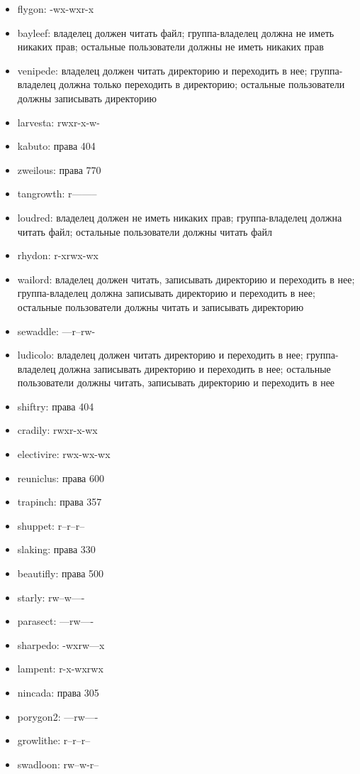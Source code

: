 \documentclass{article}
\begin{document}
\begin{itemize}
  \item flygon: -wx-wxr-x
  \item bayleef: владелец должен читать файл; группа-владелец должна не иметь никаких прав; остальные пользователи должны не иметь никаких прав
  \item venipede: владелец должен читать директорию и переходить в нее; группа-владелец должна только переходить в директорию; остальные пользователи должны записывать директорию
  \item larvesta: rwxr-x-w-
  \item kabuto: права 404
  \item zweilous: права 770
  \item tangrowth: r--------
  \item loudred: владелец должен не иметь никаких прав; группа-владелец должна читать файл; остальные пользователи должны читать файл
  \item rhydon: r-xrwx-wx
  \item wailord: владелец должен читать, записывать директорию и переходить в нее; группа-владелец должна записывать директорию и переходить в нее; остальные пользователи должны читать и записывать директорию
  \item sewaddle: ---r--rw-
  \item ludicolo: владелец должен читать директорию и переходить в нее; группа-владелец должна записывать директорию и переходить в нее; остальные пользователи должны читать, записывать директорию и переходить в нее
  \item shiftry: права 404
  \item cradily: rwxr-x-wx
  \item electivire: rwx-wx-wx
  \item reuniclus: права 600
  \item trapinch: права 357
  \item shuppet: r--r--r--
  \item slaking: права 330
  \item beautifly: права 500
  \item starly: rw--w----
  \item parasect: ---rw----
  \item sharpedo: -wxrw---x
  \item lampent: r-x-wxrwx
  \item nincada: права 305
  \item porygon2: ---rw----
  \item growlithe: r--r--r--
  \item swadloon: rw--w-r--

\end{itemize}
\end{document}
